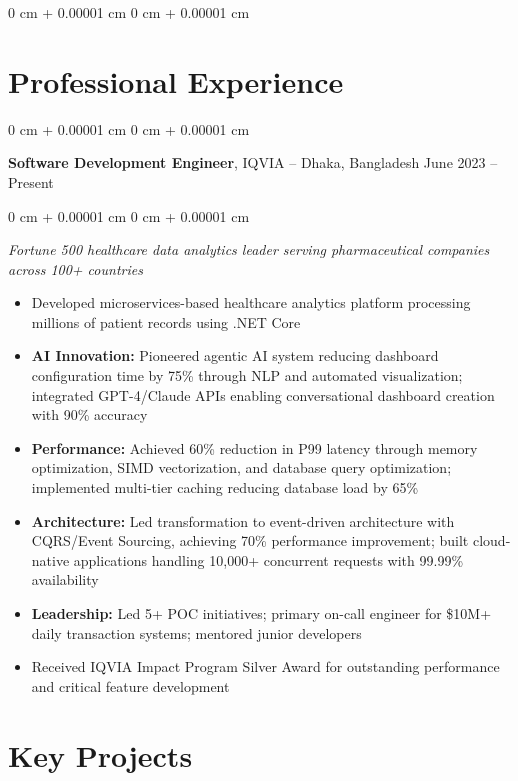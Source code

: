 \documentclass[10pt, letterpaper]{article}
\newenvironment{highlights}{
    \begin{itemize}[
        topsep=0.05 cm,
        parsep=0.05 cm,
        partopsep=0pt,
        itemsep=0pt,
        leftmargin=0 cm + 10pt
    ]
}{
    \end{itemize}
} %
\newenvironment{onecolentry}{
    \begin{adjustwidth}{
        0 cm + 0.00001 cm
    }{
        0 cm + 0.00001 cm
    }
}{
    \end{adjustwidth}
} %
\newenvironment{twocolentry}[2][]{
    \onecolentry
    \def\secondColumn{#2}
    \setcolumnwidth{\fill, 4.5 cm}
    \begin{paracol}{2}
}{
    \switchcolumn \raggedleft \secondColumn
    \end{paracol}
    \endonecolentry
} %
\newenvironment{header}{
    \setlength{\topsep}{0pt}\par\kern\topsep\centering\linespread{0.95}
}{
    \par\kern\topsep
} %
\begin{document}
\begin{header}
\begin{onecolentry}
    \section{Professional Experience}
        
        \begin{twocolentry}{
            June 2023 – Present
        }
            \textbf{Software Development Engineer}, IQVIA -- Dhaka, Bangladesh\end{twocolentry}
        \begin{onecolentry}
            \textit{Fortune 500 healthcare data analytics leader serving pharmaceutical companies across 100+ countries}
            \begin{highlights}
                \item Developed microservices-based healthcare analytics platform processing millions of patient records using .NET Core
                \item \textbf{AI Innovation:} Pioneered agentic AI system reducing dashboard configuration time by 75\% through NLP and automated visualization; integrated GPT-4/Claude APIs enabling conversational dashboard creation with 90\% accuracy
                \item \textbf{Performance:} Achieved 60\% reduction in P99 latency through memory optimization, SIMD vectorization, and database query optimization; implemented multi-tier caching reducing database load by 65\%
                \item \textbf{Architecture:} Led transformation to event-driven architecture with CQRS/Event Sourcing, achieving 70\% performance improvement; built cloud-native applications handling 10,000+ concurrent requests with 99.99\% availability
                \item \textbf{Leadership:} Led 5+ POC initiatives; primary on-call engineer for \$10M+ daily transaction systems; mentored junior developers
                \item Received IQVIA Impact Program Silver Award for outstanding performance and critical feature development
            \end{highlights}
        \end{onecolentry}

    \section{Key Projects}


\end{onecolentry}
\end{header}
\end{document}
